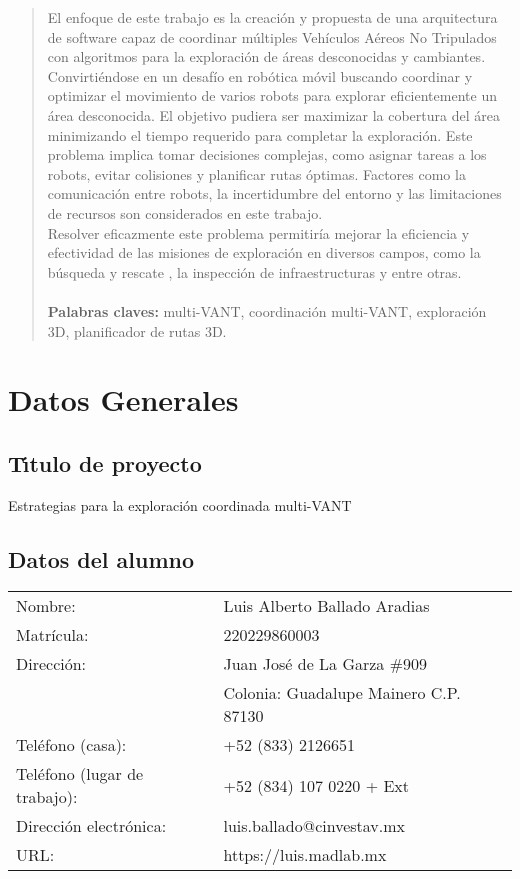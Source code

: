 \documentclass[11pt,epsf,times]{article}
\begin{document}
\begin{abstract}
  El enfoque de este trabajo es la creaci\'{o}n y propuesta de una arquitectura de software capaz de coordinar m\'{u}ltiples Veh\'{i}culos A\'{e}reos No Tripulados con algoritmos para la exploraci\'{o}n de \'{a}reas desconocidas y cambiantes. Convirti\'{e}ndose en un desaf\'{i}o en rob\'{o}tica m\'{o}vil buscando coordinar y optimizar el movimiento de varios robots para explorar eficientemente un \'{a}rea desconocida. El objetivo pudiera ser maximizar la cobertura del \'{a}rea minimizando el tiempo requerido para completar la exploraci\'{o}n. Este problema implica tomar decisiones complejas, como asignar tareas a los robots, evitar colisiones y planificar rutas \'{o}ptimas. Factores como la comunicaci\'{o}n entre robots, la incertidumbre del entorno y las limitaciones de recursos son considerados en este trabajo.\\
  Resolver eficazmente este problema permitir\'{i}a mejorar la eficiencia y efectividad de las misiones de exploraci\'{o}n en diversos campos, como la b\'{u}squeda y rescate \cite{MITNEWS2018}, la inspecci\'{o}n de infraestructuras y entre otras. \\
  \medskip \\
  
  \noindent \textbf{Palabras claves:} multi-VANT, coordinaci\'{o}n multi-VANT, exploraci\'{o}n 3D, planificador de rutas 3D.
  
\end{abstract}

\newpage
\section*{Datos Generales}

\subsection*{T\'{\i}tulo de proyecto}
Estrategias para la exploraci\'{o}n coordinada multi-VANT
\subsection*{Datos del alumno}
\begin{tabular}{ll} 
  Nombre:  &          Luis Alberto Ballado Aradias \\
  Matr\'{i}cula: &   220229860003\\
Direcci\'{o}n:   & Juan Jos\'{e} de La Garza \#909\\
                 & Colonia: Guadalupe Mainero C.P. 87130\\
Tel\'{e}fono (casa):    & +52 (833) 2126651\\
Tel\'{e}fono (lugar de trabajo):    & +52 (834) 107 0220 + Ext  \\
Direcci\'{o}n electr\'{o}nica: & luis.ballado@cinvestav.mx \\
URL: & https://luis.madlab.mx
\end{tabular}
\end{document}
